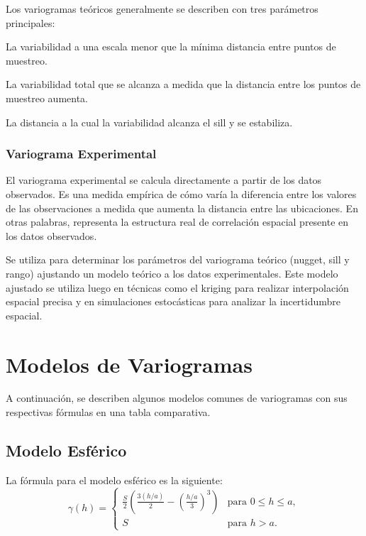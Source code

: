 Los variogramas teóricos generalmente se describen con tres parámetros principales:
\begin{description}[leftmargin=1cm, style=sameline]
    \item[Nugget (Efecto Pepita):] La variabilidad a una escala menor que la mínima distancia entre puntos de muestreo.
    \item[Sill (Meseta):] La variabilidad total que se alcanza a medida que la distancia entre los puntos de muestreo aumenta.
    \item[Rango:] La distancia a la cual la variabilidad alcanza el sill y se estabiliza.
\end{description}

\subsubsection*{Variograma Experimental}

El variograma experimental se calcula directamente a partir de los datos observados. Es una medida empírica de cómo varía la diferencia entre los valores de las observaciones a medida que aumenta la distancia entre las ubicaciones. En otras palabras, representa la estructura real de correlación espacial presente en los datos observados.

Se utiliza para determinar los parámetros del variograma teórico (nugget, sill y rango) ajustando un modelo teórico a los datos experimentales. Este modelo ajustado se utiliza luego en técnicas como el kriging para realizar interpolación espacial precisa y en simulaciones estocásticas para analizar la incertidumbre espacial.
\section{Modelos de Variogramas}

A continuación, se describen algunos modelos comunes de variogramas con sus respectivas fórmulas en una tabla comparativa.


\subsection{Modelo Esférico}

La fórmula para el modelo esférico es la siguiente:
\[
\gamma(h) =
\begin{cases}
\frac{S}{2} \left( \frac{3(h/a)}{2} - \left(\frac{h/a}{3}\right)^3 \right) & \text{para } 0 \leq h \leq a, \\
S & \text{para } h > a.
\end{cases}
\]

